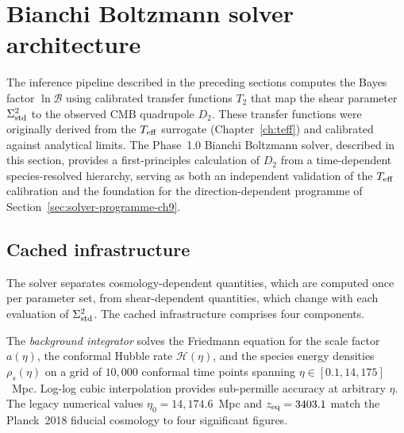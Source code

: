 

\section{Bianchi Boltzmann solver architecture}
\label{sec:solver-arch}

The inference pipeline described in the preceding sections
computes the Bayes factor $\ln \mathcal{B}$ using calibrated
transfer functions $T_2$ that map the shear parameter
$\Sigma^2_{\mathrm{std}}$ to the observed CMB quadrupole $D_2$.  These
transfer functions were originally derived from the $T_{\mathrm{eff}}$
surrogate (Chapter~\ref{ch:teff}) and calibrated against
analytical limits.  The Phase~1.0 Bianchi Boltzmann solver,
described in this section, provides a first-principles
calculation of $D_2$ from a time-dependent species-resolved
hierarchy, serving as both an independent validation of the
$T_{\mathrm{eff}}$ calibration and the foundation for the
direction-dependent programme of
Section~\ref{sec:solver-programme-ch9}.


\subsection{Cached infrastructure}
\label{sec:solver-cached}
\label{sec:solver-performance}
\label{sec:recombination}

The solver separates cosmology-dependent quantities, which are
computed once per parameter set, from shear-dependent quantities,
which change with each evaluation of $\Sigma^2_{\mathrm{std}}$.  The cached
infrastructure comprises four components.

The \emph{background integrator} solves the Friedmann equation
for the scale factor $a(\eta)$, the conformal Hubble rate
$\mathcal{H}(\eta)$, and the species energy densities
$\rho_s(\eta)$ on a grid of $10{,}000$ conformal time points
spanning $\eta \in [0.1, 14{,}175]$~Mpc.  Log-log cubic
interpolation provides sub-permille accuracy at arbitrary
$\eta$.  The legacy numerical values $\eta_0 = 14{,}174.6$~Mpc and
$z_{\rm eq} = 3403.1$ match the Planck~2018 fiducial cosmology
to four significant figures.

